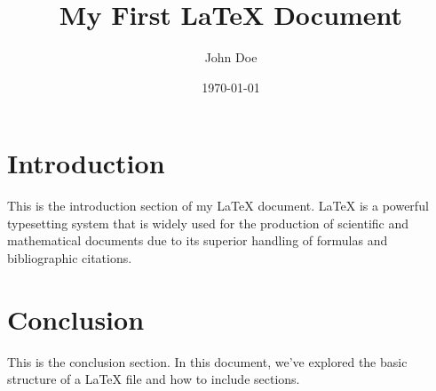 \documentclass{article}
\title{My First LaTeX Document}
\author{John Doe}
\date{\today}
\begin{document}
\maketitle
\section{Introduction}
This is the introduction section of my LaTeX document. LaTeX is a powerful typesetting system that is widely used for the production of scientific and mathematical documents due to its superior handling of formulas and bibliographic citations.

\section{Conclusion}
This is the conclusion section. In this document, we've explored the basic structure of a LaTeX file and how to include sections.
\end{document}
